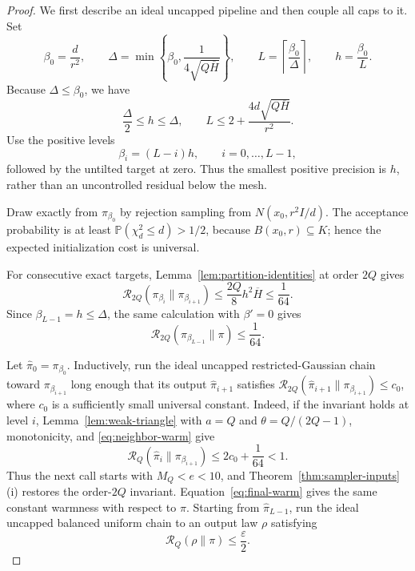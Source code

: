 \documentclass[11pt]{article}
\theoremstyle{remark}
\newcommand{\Pp}{\mathbb P}
\newcommand{\1}{\bm 1}
\newcommand{\eps}{\varepsilon}
\begin{document}
\begin{proof}
We first describe an ideal uncapped pipeline and then couple all caps to
it.  Set
\[
  \beta_0=\frac d{r^2},
  \qquad
  \Delta=\min\!\left\{\beta_0,
    \frac{1}{4\sqrt{Q\overline H}}\right\},
  \qquad
  L=\left\lceil\frac{\beta_0}{\Delta}\right\rceil,
  \qquad
  h=\frac{\beta_0}{L}.
\]
Because $\Delta\leq\beta_0$, we have
\begin{equation}\label{eq:grid-comparison}
  \frac{\Delta}{2}\leq h\leq\Delta,
  \qquad
  L\leq2+\frac{4d\sqrt{Q\overline H}}{r^2}.
\end{equation}
Use the positive levels
\[
  \beta_i=(L-i)h,
  \qquad i=0,\ldots,L-1,
\]
followed by the untilted target at zero.  Thus the smallest positive
precision is $h$, rather than an uncontrolled residual below the mesh.

Draw exactly from $\pi_{\beta_0}$ by rejection sampling from
$N(x_0,r^2I/d)$.  The acceptance probability is at least
$\Pp(\chi_d^2\leq d)>1/2$, because
$B(x_0,r)\subseteq K$; hence the expected initialization cost is
universal.

For consecutive exact targets, Lemma~\ref{lem:partition-identities} at
order $2Q$ gives
\begin{equation}\label{eq:neighbor-warm}
  \mathcal R_{2Q}(\pi_{\beta_i}\|\pi_{\beta_{i+1}})
  \leq \frac{2Q}{8}h^2\overline H
  \leq\frac1{64}.
\end{equation}
Since $\beta_{L-1}=h\leq\Delta$, the same calculation with
$\beta'=0$ gives
\begin{equation}\label{eq:final-warm}
  \mathcal R_{2Q}(\pi_{\beta_{L-1}}\|\pi)
  \leq\frac1{64}.
\end{equation}

Let $\widehat\pi_0=\pi_{\beta_0}$.  Inductively, run the ideal uncapped
restricted-Gaussian chain toward $\pi_{\beta_{i+1}}$ long enough that
its output $\widehat\pi_{i+1}$ satisfies
$\mathcal R_{2Q}(\widehat\pi_{i+1}\|\pi_{\beta_{i+1}})\leq c_0$, where
$c_0$ is a sufficiently small universal constant.  Indeed, if the
invariant holds at level $i$, Lemma~\ref{lem:weak-triangle} with
$a=Q$ and $\theta=Q/(2Q-1)$, monotonicity, and
\eqref{eq:neighbor-warm} give
\[
  \mathcal R_Q(\widehat\pi_i\|\pi_{\beta_{i+1}})
  \leq 2c_0+\frac1{64}<1.
\]
Thus the next call starts with $M_Q<e<10$, and
Theorem~\ref{thm:sampler-inputs}(i) restores the order-$2Q$ invariant.
Equation~\eqref{eq:final-warm} gives the same constant warmness with
respect to $\pi$.  Starting from $\widehat\pi_{L-1}$, run the ideal
uncapped balanced uniform chain to an output law $\rho$ satisfying
\begin{equation}\label{eq:ideal-final-error}
  \mathcal R_Q(\rho\|\pi)\leq\frac\eps2.
\end{equation}


\end{proof}
\end{document}
